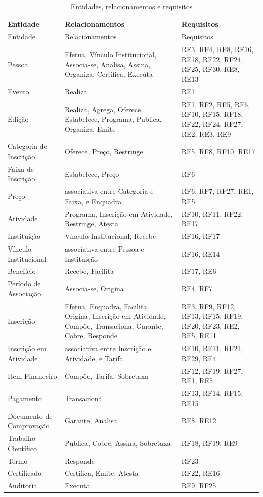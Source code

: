 \begin{longtable}{@{}L{3.3cm} L{5.9cm} L{4.8cm}@{}}
\caption{Entidades, relacionamentos e requisitos}\label{tab:sistematizacao}\\
\toprule
Entidade & Relacionamentos & Requisitos\\
\midrule
\endfirsthead
\toprule
Entidade & Relacionamentos & Requisitos\\
\midrule
\endhead
\bottomrule
\endfoot
Pessoa & Efetua, Vínculo Institucional, Associa-se, Analisa, Assina, Organiza, Certifica, Executa & RF3, RF4, RF8, RF16, RF18, RF22, RF24, RF25, RF30, RE8, RE13\\
Evento & Realiza & RF1\\
Edição & Realiza, Agrega, Oferece, Estabelece, Programa, Publica, Organiza, Emite & RF1, RF2, RF5, RF6, RF10, RF15, RF18, RF22, RF24, RF27, RE2, RE3, RE9\\
Categoria de Inscrição & Oferece, Preço, Restringe & RF5, RF8, RF10, RE17\\
Faixa de Inscrição & Estabelece, Preço & RF6\\
Preço & associativa entre Categoria e Faixa, e Enquadra & RF6, RF7, RF27, RE1, RE5\\
Atividade & Programa, Inscrição em Atividade, Restringe, Atesta & RF10, RF11, RF22, RE17\\
Instituição & Vínculo Institucional, Recebe & RF16, RF17\\
Vínculo Institucional & associativa entre Pessoa e Instituição & RF16, RE14\\
Benefício & Recebe, Facilita & RF17, RE6\\
Período de Associação & Associa-se, Origina & RF4, RF7\\
Inscrição & Efetua, Enquadra, Facilita, Origina, Inscrição em Atividade, Compõe, Transaciona, Garante, Cobre, Responde & RF3, RF9, RF12, RF13, RF15, RF19, RF20, RF23, RE2, RE5, RE11\\
Inscrição em Atividade & associativa entre Inscrição e Atividade, e Tarifa & RF10, RF11, RF21, RF29, RE4\\
Item Financeiro & Compõe, Tarifa, Sobretaxa & RF12, RF19, RF27, RE1, RE5\\
Pagamento & Transaciona & RF13, RF14, RF15, RE15\\
Documento de Comprovação & Garante, Analisa & RF8, RE12\\
Trabalho Científico & Publica, Cobre, Assina, Sobretaxa & RF18, RF19, RE9\\
Termo & Responde & RF23\\
Certificado & Certifica, Emite, Atesta & RF22, RE16\\
Auditoria & Executa & RF9, RF25\\
\end{longtable}
